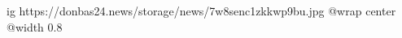 
 
 
 
 

\ifcmt
  ig https://donbas24.news/storage/news/7w8senc1zkkwp9bu.jpg
  @wrap center
  @width 0.8
\fi
